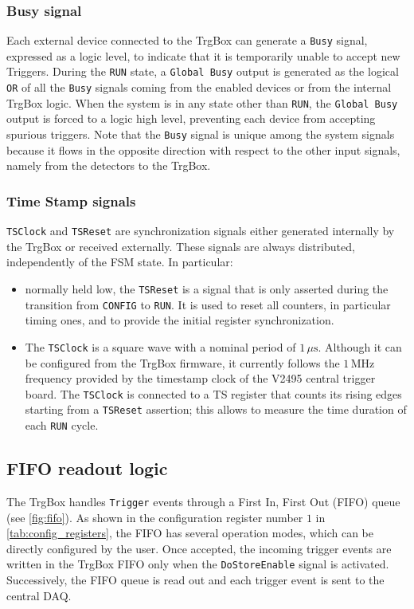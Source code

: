 \subsubsection{Busy signal}\label{sssec:busy_signal}
Each external device connected to the TrgBox can generate a \texttt{Busy} signal, expressed as a logic level, to indicate that it is temporarily unable to accept new Triggers. During the \texttt{RUN} state, a \texttt{Global Busy} output is generated as the logical \texttt{OR} of all the \texttt{Busy} signals coming from the enabled devices or from the internal TrgBox logic. When the system is in any state other than \texttt{RUN}, the \texttt{Global Busy} output is forced to a logic high level, preventing each device from accepting spurious triggers. Note that the \texttt{Busy} signal is unique among the system signals because it flows in the opposite direction with respect to the other input signals, namely from the detectors to the TrgBox.
\subsubsection{Time Stamp signals}\label{sssec:timestamp_signals}
\texttt{TSClock} and \texttt{TSReset} are synchronization signals either generated internally by the TrgBox or received externally. These signals are always distributed, independently of the FSM state. In particular:
\begin{itemize}
	\item normally held low, the \texttt{TSReset} is a signal that is only asserted during the transition from \texttt{CONFIG} to \texttt{RUN}. It is used to reset all counters, in particular timing ones, and to provide the initial register synchronization.
	\item The \texttt{TSClock} is a square wave with a nominal period of $1\,\mu\mathrm{s}$. Although it can be configured from the TrgBox firmware, it currently follows the $1\,\mathrm{MHz}$ frequency provided by the timestamp clock of the V2495 central trigger board. The \texttt{TSClock} is connected to a TS register that counts its rising edges starting from a \texttt{TSReset} assertion; this allows to measure the time duration of each \texttt{RUN} cycle.
\end{itemize}
\subsection{FIFO readout logic}\label{ssec:fifo}
The TrgBox handles \texttt{Trigger} events through a First In, First Out (FIFO) queue (see \autoref{fig:fifo}). As shown in the configuration register number $1$ in \autoref{tab:config_registers}, the FIFO has several operation modes, which can be directly configured by the user. Once accepted, the incoming trigger events are written in the TrgBox FIFO only when the \texttt{DoStoreEnable} signal is activated. Successively, the FIFO queue is read out and each trigger event is sent to the central DAQ.

